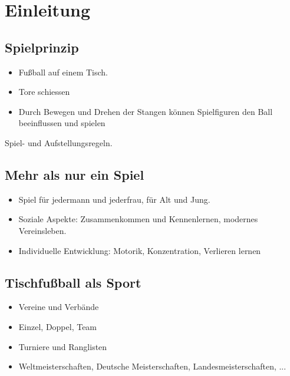 \chapter{Einleitung}

\section{Spielprinzip}

\begin{itemize}
\item Fußball auf einem Tisch.
\item Tore schiessen
\item Durch Bewegen und Drehen der Stangen können Spielfiguren den Ball beeinflussen und spielen
\end{itemize}

Spiel- und Aufstellungsregeln.

\section{Mehr als nur ein Spiel}

\begin{itemize}
\item Spiel für jedermann und jederfrau, für Alt und Jung. 
\item Soziale Aspekte: Zusammenkommen und Kennenlernen, modernes Vereinsleben.
\item Individuelle Entwicklung: Motorik, Konzentration, Verlieren lernen
\end{itemize}

\section{Tischfußball als Sport}

\begin{itemize}
\item Vereine und Verbände
\item Einzel, Doppel, Team
\item Turniere und Ranglisten
\item Weltmeisterschaften, Deutsche Meisterschaften, Landesmeisterschaften, ...
\end{itemize}

